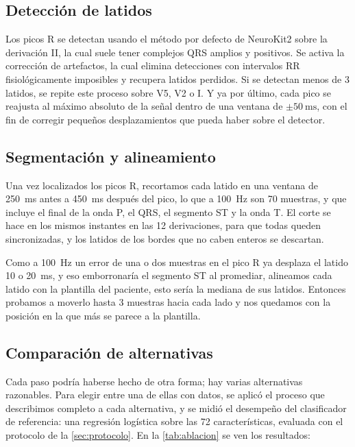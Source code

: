 \subsection{Detección de latidos}

Los picos R se detectan usando el método por defecto de NeuroKit2 sobre la derivación II, la cual suele tener complejos QRS amplios y positivos. Se activa la corrección de artefactos, la cual elimina detecciones con intervalos RR fisiológicamente imposibles y recupera latidos perdidos. Si se detectan menos de 3 latidos, se repite este proceso sobre V5, V2 o I. Y ya por último, cada pico se reajusta al máximo absoluto de la señal dentro de una ventana de $\pm\SI{50}{\milli\second}$, con el fin de corregir pequeños desplazamientos que pueda haber sobre el detector.

\subsection{Segmentación y alineamiento}

Una vez localizados los picos R, recortamos cada latido en una ventana de \SI{250}{\milli\second} antes a \SI{450}{\milli\second} después del pico, lo que a \SI{100}{\hertz} son 70 muestras, y que incluye el final de la onda P, el QRS, el segmento ST y la onda T. El corte se hace en los mismos instantes en las 12 derivaciones, para que todas queden sincronizadas, y los latidos de los bordes que no caben enteros se descartan.

Como a \SI{100}{\hertz} un error de una o dos muestras en el pico R ya desplaza el latido 10 o \SI{20}{\milli\second}, y eso emborronaría el segmento ST al promediar, alineamos cada latido con la plantilla del paciente, esto sería la mediana de sus latidos. Entonces probamos a moverlo hasta 3 muestras hacia cada lado y nos quedamos con la posición en la que más se parece a la plantilla.

\subsection{Comparación de alternativas}\label{sec:ablacion-preprocesado}

Cada paso podría haberse hecho de otra forma; hay varias alternativas razonables. Para elegir entre una de ellas con datos, se aplicó el proceso que describimos completo a cada alternativa, y se midió el desempeño del clasificador de referencia: una regresión logística sobre las 72 características, evaluada con el protocolo de la \cref{sec:protocolo}. En la \cref{tab:ablacion} se ven los resultados:

